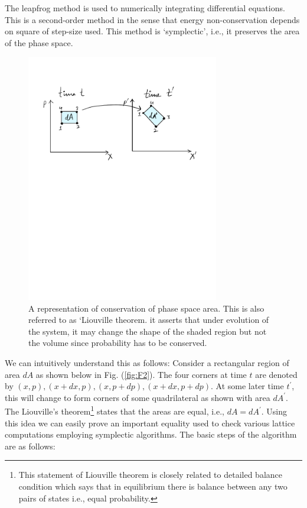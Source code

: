 \documentclass[11pt]{article}
\begin{document}
The leapfrog method is used to numerically integrating differential equations. This is a second-order method in the sense that energy non-conservation depends on square of step-size used. This method is `symplectic', i.e., it preserves the area of the phase space. 
\begin{figure}[htbp] 
\centering 
\includegraphics[width=0.75\textwidth]{figs/PSP.pdf}
\caption{\label{fig:F1}A representation of conservation of phase space area. This is also referred to as `Liouville theorem. it asserts that under evolution of the system, it may change the shape of the shaded region but not the volume since probability has to be conserved. }
\end{figure}
We can intuitively understand this as follows: 
Consider a rectangular region of area $dA$ as shown below in Fig. (\ref{fig:F2}). The four corners at time $t$ are denoted by $(x, p), (x + dx, p), (x, p + dp), (x + dx, p + dp)$. At some later time $t^{\prime}$, this will change to form corners of some quadrilateral 
as shown with area $dA^{\prime}$. 
The Liouville's theorem\footnote{This statement of Liouville theorem is closely related to detailed balance condition which says that in equilibrium there is balance between any two pairs of states i.e., equal probability.} states that the areas are equal, i.e., $dA = dA^{\prime}$. 
Using this idea we can easily prove an important equality used to check various lattice computations employing symplectic algorithms. The basic steps of the algorithm are as follows:
\end{document}
